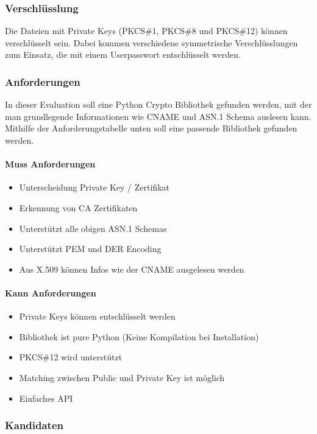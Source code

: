 \subsubsection{Verschlüsslung}
Die Dateien mit Private Keys (PKCS\#1, PKCS\#8 und PKCS\#12) können verschlüsselt sein. Dabei kommen verschiedene symmetrische Verschlüsslungen zum Einsatz, die mit einem Userpasswort entschlüsselt werden.


\subsubsection{Anforderungen}
In dieser Evaluation soll eine Python Crypto Bibliothek gefunden werden, mit der man grundlegende Informationen wie CNAME und ASN.1 Schema auslesen kann. Mithilfe der Anforderungstabelle unten soll eine passende Bibliothek gefunden werden.

\paragraph{Muss Anforderungen}
\begin{itemize}
	\item Unterscheidung Private Key / Zertifikat
	\item Erkennung von CA Zertifikaten
	\item Unterstützt alle obigen ASN.1 Schemas
	\item Unterstützt PEM und DER Encoding
	\item Aus X.509 können Infos wie der CNAME ausgelesen werden	
\end{itemize}

\paragraph{Kann Anforderungen}
\begin{itemize}
	\item Private Keys können entschlüsselt werden	
	\item Bibliothek ist pure Python (Keine Kompilation bei Installation)
	\item PKCS\#12 wird unterstützt
	\item Matching zwischen Public und Private Key ist möglich
	\item Einfaches API
\end{itemize}

\subsubsection{Kandidaten}

